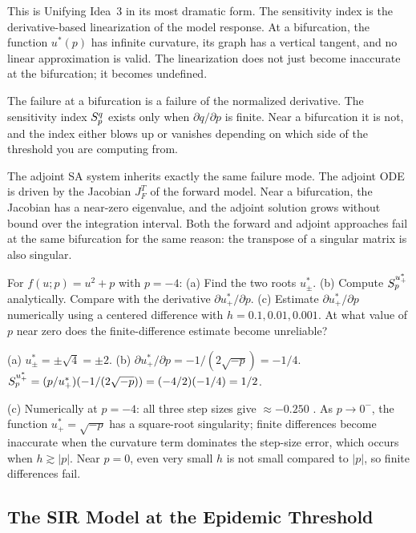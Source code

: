  This is Unifying Idea~3 in its most dramatic form.
The sensitivity index is the derivative-based linearization of the
model response. At a bifurcation, the function $u^*(p)$ has
infinite curvature, its graph has a vertical tangent, and
no linear approximation is valid.
The linearization does not just become inaccurate at the bifurcation;
it becomes undefined.

 The failure at a bifurcation is a failure of the
normalized derivative. The sensitivity index $S_{p}^{q}$ exists only
when $\partial q/\partial p$ is finite. Near a bifurcation it is not,
and the index either blows up or vanishes depending on which side
of the threshold you are computing from.

 The adjoint SA system inherits exactly the same
failure mode. The adjoint ODE is driven by the Jacobian $J_F^T$
of the forward model. Near a bifurcation, the Jacobian has a
near-zero eigenvalue, and the adjoint solution grows without bound
over the integration interval. Both the forward and adjoint
approaches fail at the same bifurcation for the same reason:
the transpose of a singular matrix is also singular.

\begin{selfcheck}
For $f(u;p) = u^2 + p$ with $p = -4$:
(a) Find the two roots $u^*_\pm$.
(b) Compute $S_{p}^{u^*_+}$ analytically. Compare with the derivative $\partial u^*_+/\partial p$.
(c) Estimate $\partial u^*_+/\partial p$ numerically using a centered difference
    with $h = 0.1, 0.01, 0.001$. At what value of $p$ near zero does
    the finite-difference estimate become unreliable?
\end{selfcheck}
\begin{scAnswer}
(a) $u^*_\pm = \pm\sqrt{4} = \pm 2$.
(b) $\partial u^*_+/\partial p = -1/(2\sqrt{-p}) = -1/4$.
$S_{p}^{u^*_+} = (p/u^*_+)(-1/(2\sqrt{-p})) = (-4/2)(-1/4) = 1/2$.

(c) Numerically at $p = -4$: all three step sizes give $\approx -0.250$ \checkmark.
As $p \to 0^-$, the function $u^*_+ = \sqrt{-p}$ has a square-root singularity;
finite differences become inaccurate when the curvature term dominates the
step-size error, which occurs when $h \gtrsim |p|$. Near $p = 0$, even very
small $h$ is not small compared to $|p|$, so finite differences fail.
\end{scAnswer}

\subsection{The SIR Model at the Epidemic Threshold}

